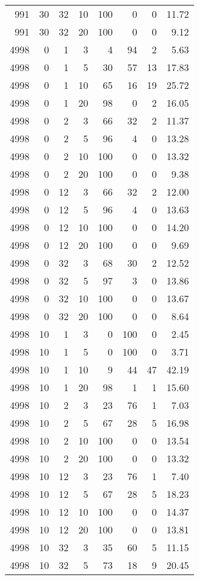 \begin{tabular}{rrrrrrrr}
991 & 30 & 32 & 10 & 100 & 0 & 0 & 11.72 \\
991 & 30 & 32 & 20 & 100 & 0 & 0 & 9.12 \\
4998 & 0 & 1 & 3 & 4 & 94 & 2 & 5.63 \\
4998 & 0 & 1 & 5 & 30 & 57 & 13 & 17.83 \\
4998 & 0 & 1 & 10 & 65 & 16 & 19 & 25.72 \\
4998 & 0 & 1 & 20 & 98 & 0 & 2 & 16.05 \\
4998 & 0 & 2 & 3 & 66 & 32 & 2 & 11.37 \\
4998 & 0 & 2 & 5 & 96 & 4 & 0 & 13.28 \\
4998 & 0 & 2 & 10 & 100 & 0 & 0 & 13.32 \\
4998 & 0 & 2 & 20 & 100 & 0 & 0 & 9.38 \\
4998 & 0 & 12 & 3 & 66 & 32 & 2 & 12.00 \\
4998 & 0 & 12 & 5 & 96 & 4 & 0 & 13.63 \\
4998 & 0 & 12 & 10 & 100 & 0 & 0 & 14.20 \\
4998 & 0 & 12 & 20 & 100 & 0 & 0 & 9.69 \\
4998 & 0 & 32 & 3 & 68 & 30 & 2 & 12.52 \\
4998 & 0 & 32 & 5 & 97 & 3 & 0 & 13.86 \\
4998 & 0 & 32 & 10 & 100 & 0 & 0 & 13.67 \\
4998 & 0 & 32 & 20 & 100 & 0 & 0 & 8.64 \\
4998 & 10 & 1 & 3 & 0 & 100 & 0 & 2.45 \\
4998 & 10 & 1 & 5 & 0 & 100 & 0 & 3.71 \\
4998 & 10 & 1 & 10 & 9 & 44 & 47 & 42.19 \\
4998 & 10 & 1 & 20 & 98 & 1 & 1 & 15.60 \\
4998 & 10 & 2 & 3 & 23 & 76 & 1 & 7.03 \\
4998 & 10 & 2 & 5 & 67 & 28 & 5 & 16.98 \\
4998 & 10 & 2 & 10 & 100 & 0 & 0 & 13.54 \\
4998 & 10 & 2 & 20 & 100 & 0 & 0 & 13.32 \\
4998 & 10 & 12 & 3 & 23 & 76 & 1 & 7.40 \\
4998 & 10 & 12 & 5 & 67 & 28 & 5 & 18.23 \\
4998 & 10 & 12 & 10 & 100 & 0 & 0 & 14.37 \\
4998 & 10 & 12 & 20 & 100 & 0 & 0 & 13.81 \\
4998 & 10 & 32 & 3 & 35 & 60 & 5 & 11.15 \\
4998 & 10 & 32 & 5 & 73 & 18 & 9 & 20.45 \\

\end{tabular}
